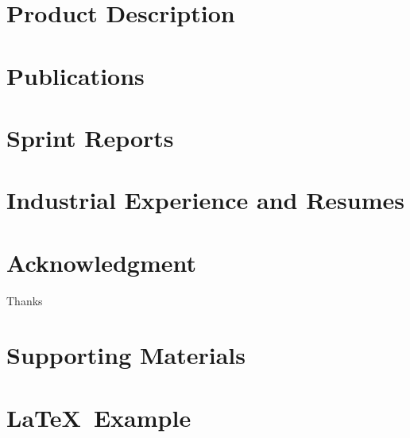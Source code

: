 \documentclass{book}
\begin{document}
\chapter{Product Description}


\chapter{Publications}   %


\chapter{Sprint Reports}


\chapter{Industrial Experience and Resumes}


\chapter{Acknowledgment}
\label{SpecialThanks}  
Thanks  

\chapter{Supporting Materials}


\backmatter

%

\chapter{\LaTeX\ Example}

\end{document}

